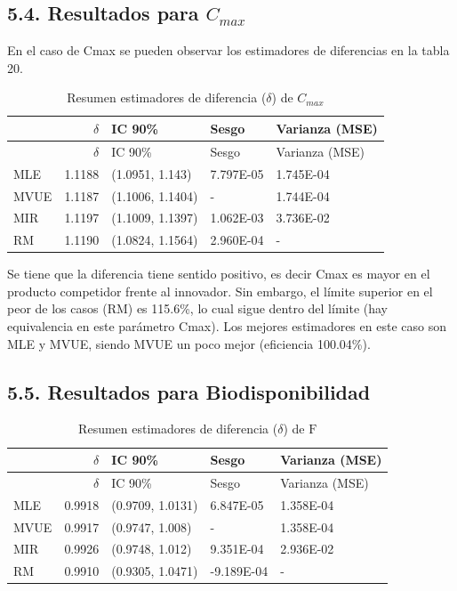 \documentclass[]{article}
\begin{document}
\subsection{\texorpdfstring{5.4. Resultados para
\(C_{max}\)}{5.4. Resultados para C\_\{max\}}}\label{resultados-para-c_max}

En el caso de Cmax se pueden observar los estimadores de diferencias en
la tabla 20.

\begin{longtable}[]{@{}lrlll@{}}
\caption{Resumen estimadores de diferencia (\(\delta\)) de
\(C_{max}\)}\tabularnewline
\toprule
& \(\delta\) & IC 90\% & Sesgo & Varianza (MSE)\tabularnewline
\midrule
\endfirsthead
\toprule
& \(\delta\) & IC 90\% & Sesgo & Varianza (MSE)\tabularnewline
\midrule
\endhead
MLE & 1.1188 & (1.0951, 1.143) & 7.797E-05 & 1.745E-04\tabularnewline
MVUE & 1.1187 & (1.1006, 1.1404) & - & 1.744E-04\tabularnewline
MIR & 1.1197 & (1.1009, 1.1397) & 1.062E-03 & 3.736E-02\tabularnewline
RM & 1.1190 & (1.0824, 1.1564) & 2.960E-04 & -\tabularnewline
\bottomrule
\end{longtable}

Se tiene que la diferencia tiene sentido positivo, es decir Cmax es
mayor en el producto competidor frente al innovador. Sin embargo, el
límite superior en el peor de los casos (RM) es 115.6\%, lo cual sigue
dentro del límite (hay equivalencia en este parámetro Cmax). Los mejores
estimadores en este caso son MLE y MVUE, siendo MVUE un poco mejor
(eficiencia 100.04\%).

\subsection{5.5. Resultados para
Biodisponibilidad}\label{resultados-para-biodisponibilidad}

\begin{longtable}[]{@{}lrlll@{}}
\caption{Resumen estimadores de diferencia (\(\delta\)) de
\(\textrm{F}\)}\tabularnewline
\toprule
& \(\delta\) & IC 90\% & Sesgo & Varianza (MSE)\tabularnewline
\midrule
\endfirsthead
\toprule
& \(\delta\) & IC 90\% & Sesgo & Varianza (MSE)\tabularnewline
\midrule
\endhead
MLE & 0.9918 & (0.9709, 1.0131) & 6.847E-05 & 1.358E-04\tabularnewline
MVUE & 0.9917 & (0.9747, 1.008) & - & 1.358E-04\tabularnewline
MIR & 0.9926 & (0.9748, 1.012) & 9.351E-04 & 2.936E-02\tabularnewline
RM & 0.9910 & (0.9305, 1.0471) & -9.189E-04 & -\tabularnewline
\bottomrule
\end{longtable}
\end{document}
